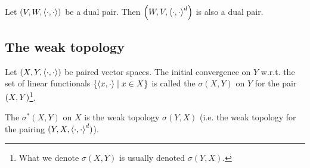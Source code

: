 \begin{lemma}
Let $\left( V,W,\left\langle \cdot,\cdot \right\rangle \right)$ be a dual pair. Then $\left( W,V,\left\langle \cdot,\cdot \right\rangle^d \right)$ is also a dual pair.
\end{lemma}

\subsection{The weak topology}
\begin{definition}
Let $(X,Y,\left\langle \cdot,\cdot \right\rangle)$ be paired vector spaces. 
The initial convergence on $Y$ w.r.t. the set of linear functionals $\left\{ \left\langle x,\cdot \right\rangle \;\middle|\; x\in X \right\}$ is called the  $\sigma(X,Y)$ on $Y$ for the pair $\left( X,Y \right)$\footnote{What we denote $\sigma(X,Y)$ is usually denoted $\sigma(Y,X)$.}.

The  $\sigma^*(X,Y)$ on $X$ is the weak topology $\sigma(Y,X)$ (i.e. the weak topology for the pairing $(Y,X,\left\langle \cdot,\cdot \right\rangle^d)$).
\end{definition}

